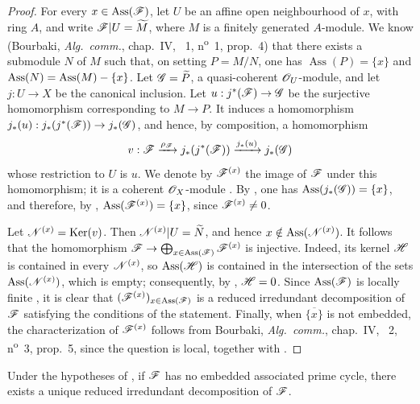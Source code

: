 \begin{proof}
For every $x\in\operatorname{Ass}(\mathscr{F})$, let $U$ be an affine open neighbourhood of $x$, with ring $A$, and write $\mathscr{F}|U=\widetilde{M}$, where $M$ is a finitely generated $A$-module.
We know (Bourbaki, \emph{Alg.\ comm.}, chap.~IV, \textsection~1, n\textsuperscript{o}~1, prop.~4) that there exists a submodule $N$ of $M$ such that, on setting $P=M/N$, one has $\operatorname{Ass}(P)=\{x\}$ and $\operatorname{Ass}(N)=\operatorname{Ass}(M)-\{x\}$.
Let $\mathscr{G}=\widetilde{P}$, a quasi-coherent $\mathscr{O}_U$-module, and let $j:U\to X$ be the canonical inclusion.  Let $u:j^*(\mathscr{F})\to\mathscr{G}$ be the surjective homomorphism corresponding to $M\to P$.  It induces a homomorphism $j_*(u):j_*(j^*(\mathscr{F}))\to j_*(\mathscr{G})$, and hence, by composition, a homomorphism
\[
v:\mathscr{F}\xrightarrow{\rho_{\mathscr{F}}}j_*(j^*(\mathscr{F}))\xrightarrow{j_*(u)}j_*(\mathscr{G})
\]
whose restriction to $U$ is $u$.  We denote by $\mathscr{F}^{(x)}$ the image of $\mathscr{F}$ under this homomorphism; it is a coherent $\mathscr{O}_X$-module .
By , one has $\operatorname{Ass}(j_*(\mathscr{G}))=\{x\}$, and therefore, by , $\operatorname{Ass}(\mathscr{F}^{(x)})=\{x\}$, since $\mathscr{F}^{(x)}\neq 0$.

Let $\mathscr{N}^{(x)}=\operatorname{Ker}(v)$.  Then $\mathscr{N}^{(x)}|U=\widetilde{N}$, and hence $x\notin\operatorname{Ass}(\mathscr{N}^{(x)})$.
It follows that the homomorphism $\mathscr{F}\to\bigoplus_{x\in\operatorname{Ass}(\mathscr{F})}\mathscr{F}^{(x)}$ is injective.  Indeed, its kernel $\mathscr{H}$ is contained in every $\mathscr{N}^{(x)}$, so $\operatorname{Ass}(\mathscr{H})$ is contained in the intersection of the sets $\operatorname{Ass}(\mathscr{N}^{(x)})$, which is empty; consequently, by , $\mathscr{H}=0$.
Since $\operatorname{Ass}(\mathscr{F})$ is locally finite , it is clear that $(\mathscr{F}^{(x)})_{x\in\operatorname{Ass}(\mathscr{F})}$ is a reduced irredundant decomposition of $\mathscr{F}$ satisfying the conditions of the statement.
Finally, when $\overline{\{x\}}$ is not embedded, the characterization of $\mathscr{F}^{(x)}$ follows from Bourbaki, \emph{Alg.\ comm.}, chap.~IV, \textsection~2, n\textsuperscript{o}~3, prop.~5, since the question is local, together with .
\end{proof}


\begin{corollary}[3.2.7]
\label{IV.3.2.7}
Under the hypotheses of , if $\mathscr{F}$ has no embedded associated prime cycle, there exists a unique reduced irredundant decomposition of $\mathscr{F}$.
\end{corollary}

